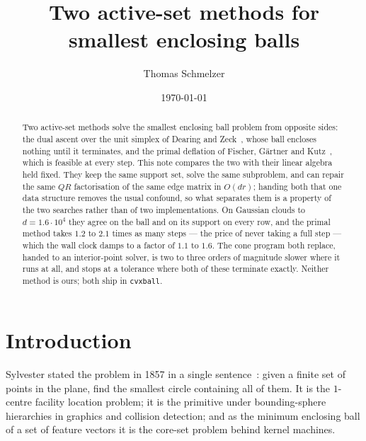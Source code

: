\documentclass[10pt,a4paper]{article}
\title{\vspace{-1.2cm}\bfseries Two active-set methods for smallest enclosing balls}
\author{Thomas Schmelzer}
\date{\today}
\theoremstyle{plain}
\begin{document}
\maketitle
\vspace{-0.6cm}

\begin{abstract}
\noindent
Two active-set methods solve the smallest enclosing ball problem from opposite
sides: the dual ascent over the unit simplex of Dearing and
Zeck~\cite{dearing2009}, whose ball encloses nothing until it terminates, and the
primal deflation of Fischer, G\"artner and Kutz~\cite{fischer2003}, which is
feasible at every step. This note compares the two with their linear algebra held
fixed. They keep the same support set, solve the same subproblem, and can repair
the same $QR$ factorisation of the same edge matrix in $O(dr)$; handing both that
one data structure removes the usual confound, so what separates them is a
property of the two searches rather than of two implementations. On Gaussian
clouds to $d=1.6\cdot10^4$ they agree on the ball and on its support on every row,
and the primal method takes $1.2$ to $2.1$ times as many steps --- the price of
never taking a full step --- which the wall clock damps to a factor of $1.1$ to
$1.6$. The cone program both replace, handed to an interior-point solver, is two
to three orders of magnitude slower where it runs at all, and stops at a tolerance
where both of these terminate exactly. Neither method is ours; both ship in
\texttt{cvxball}.
\end{abstract}

\section{Introduction}
\label{sec:intro}

Sylvester stated the problem in 1857 in a single sentence~\cite{sylvester1857}:
given a finite set of points in the plane, find the smallest circle containing
all of them. It is the $1$-centre facility location problem; it is the primitive
under bounding-sphere hierarchies in graphics and collision detection; and as the
minimum enclosing ball of a set of feature vectors it is the core-set problem
behind kernel machines.
\end{document}
